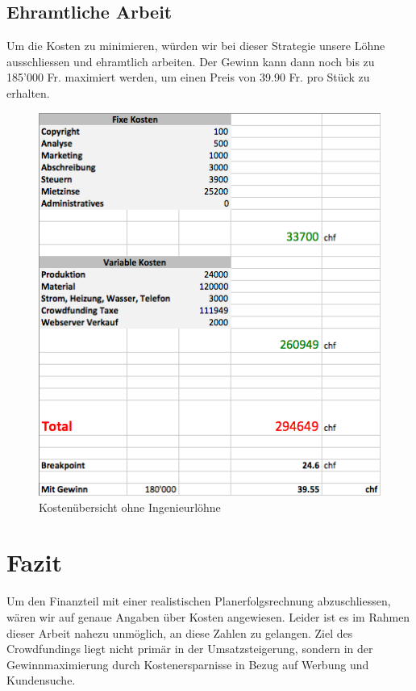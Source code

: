 \subsection{Ehramtliche Arbeit}
Um die Kosten zu minimieren, würden wir bei dieser Strategie unsere L\"ohne ausschliessen und ehramtlich arbeiten.
Der Gewinn kann dann noch bis zu 185'000 Fr. maximiert werden, um einen Preis von 39.90 Fr. pro St\"uck zu erhalten.
\begin{figure}[H]
	\centering
		\includegraphics[scale=0.6]{bilder/ehramtlich.png}
	\caption{Kosten\"ubersicht ohne Ingenieurl\"ohne}
	\label{fig:ehramtlich}
\end{figure}



\section{Fazit}
Um den Finanzteil mit einer realistischen Planerfolgsrechnung abzuschliessen, w\"aren wir auf genaue Angaben \"uber Kosten angewiesen. Leider ist es im Rahmen dieser Arbeit nahezu unm\"oglich, an diese Zahlen zu gelangen. Ziel des Crowdfundings liegt nicht prim\"ar in der Umsatzsteigerung, sondern in der Gewinnmaximierung durch Kostenersparnisse in Bezug auf Werbung und Kundensuche. 